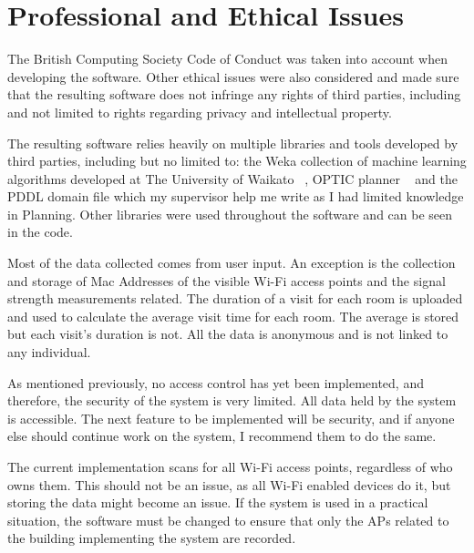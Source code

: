 \chapter{Professional and Ethical Issues}
The British Computing Society Code of Conduct was taken into account when developing the software. Other ethical issues were also considered and made sure that the resulting software does not infringe any rights of third parties, including and not limited to rights regarding privacy and intellectual property. 

The resulting software relies heavily on multiple libraries and tools developed by third parties, including but no limited to: the Weka collection of machine learning algorithms developed at The University of Waikato ~\cite{Weka}, OPTIC planner ~\cite{OPTIC} and the PDDL domain file which my supervisor help me write as I had limited knowledge in Planning. Other libraries were used throughout the software and can be seen in the code. 

Most of the data collected comes from user input. An exception is the collection and storage of Mac Addresses of the visible Wi-Fi access points and the signal strength measurements related. The duration of a visit for each room is uploaded and used to calculate the average visit time for each room. The average is stored but each visit's duration is not. All the data is anonymous and is not linked to any individual. 

As mentioned previously, no access control has yet been implemented, and therefore, the security of the system is very limited. All data held by the system is accessible. The next feature to be implemented will be security, and if anyone else should continue work on the system, I recommend them to do the same.

The current implementation scans for all Wi-Fi access points, regardless of who owns them. This should not be an issue, as all Wi-Fi enabled devices do it, but storing the data might become an issue. If the system is used in a practical situation, the software must be changed to ensure that only the APs related to the building implementing the system are recorded.

  